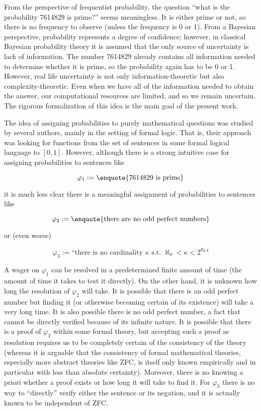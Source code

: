 \documentclass[11pt]{article}
\numberwithin{equation}{section}
\theoremstyle{definition}
\theoremstyle{plain}
\begin{document}
From the perspective of frequentist probability, the question \enquote{what is the probability 7614829 is prime?} seems meaningless. It is either prime or not, so there is no frequency to observe (unless the frequency is 0 or 1). From a Bayesian perspective, probability represents a degree of confidence; however, in classical Bayesian probability theory it is assumed that the only source of uncertainty is lack of information. The number 7614829 already contains all information needed to determine whether it is prime, so the probability again has to be 0 or 1. However, real life uncertainty is not only information-theoretic but also complexity-theoretic. Even when we have all of the information needed to obtain the answer, our computational resources are limited, and so we remain uncertain. The rigorous formalization of this idea is the main goal of the present work.

The idea of assigning probabilities to purely mathematical questions was studied by several authors\cite{Gaifman_2004,Hutter_2013,Demski_2012,Christiano_2014,Garrabrant_2015}, mainly in the setting of formal logic. That is, their approach was looking for functions from the set of sentences in some formal logical language to $[0,1]$. However, although there is a strong intuitive case for assigning probabilities to sentences like

\[\varphi_1:=\text{\enquote{7614829 is prime}}\]

it is much less clear there is a meaningful assignment of probabilities to sentences like 

\[\varphi_2 := \text{\enquote{there are no odd perfect numbers}}\] 

or (even worse) 

\[\varphi_3 := \text{``there is no cardinality } \kappa \text{ s.t. } \aleph_0 < \kappa < 2^{\aleph_0} \text{"}\]

A wager on $\varphi_1$ can be resolved in a predetermined finite amount of time (the amount of time it takes to test it directly). On the other hand, it is unknown how long the resolution of $\varphi_2$ will take. It is possible that there is an odd perfect number but finding it (or otherwise becoming certain of its existence) will take a very long time. It is also possible there is no odd perfect number, a fact that cannot be directly verified because of its infinite nature. It is possible that there is a proof of $\varphi_2$ within some formal theory, but accepting such a proof as resolution requires us to be completely certain of the consistency of the theory (whereas it is arguable that the consistency of formal mathematical theories, especially more abstract theories like ZFC, is itself only known empirically and in particular with less than absolute certainty). Moreover, there is no knowing a priori whether a proof exists or how long it will take to find it. For $\varphi_3$ there is no way to \enquote{directly} verify either the sentence or its negation, and it is actually known to be independent of ZFC.
\end{document}
